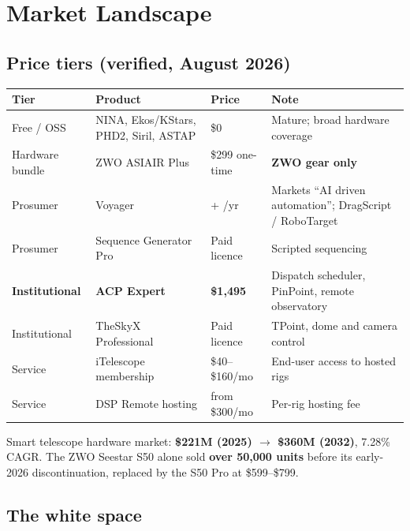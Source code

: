 \documentclass[11pt]{article}
\newcommand{\dollar}[1]{\$#1}
\begin{document}
\section{Market Landscape}

\subsection{Price tiers (verified, August 2026)}

\begin{center}
\small
\begin{tabular}{@{}p{2.6cm}p{4.1cm}p{2.6cm}p{4.4cm}@{}}
\toprule
\textbf{Tier} & \textbf{Product} & \textbf{Price} & \textbf{Note} \\
\midrule
Free / OSS & NINA, Ekos/KStars, PHD2, Siril, ASTAP & \dollar{0} & Mature; broad hardware coverage \\
\addlinespace
Hardware bundle & ZWO ASIAIR Plus & \dollar{299} one-time & \textbf{ZWO gear only} \\
\addlinespace
Prosumer & Voyager & \texteuro129 + \texteuro29/yr & Markets ``AI driven automation''; DragScript / RoboTarget \\
\addlinespace
Prosumer & Sequence Generator Pro & Paid licence & Scripted sequencing \\
\addlinespace
\textbf{Institutional} & \textbf{ACP Expert} & \textbf{\dollar{1{,}495}} & Dispatch scheduler, PinPoint, remote observatory \\
\addlinespace
Institutional & TheSkyX Professional & Paid licence & TPoint, dome and camera control \\
\addlinespace
Service & iTelescope membership & \dollar{40}--\dollar{160}/mo & End-user access to hosted rigs \\
\addlinespace
Service & DSP Remote hosting & from \dollar{300}/mo & Per-rig hosting fee \\
\bottomrule
\end{tabular}
\end{center}

\vspace{0.4em}
Smart telescope hardware market: \textbf{\dollar{221}M (2025) $\rightarrow$
\dollar{360}M (2032)}, 7.28\% CAGR. The ZWO Seestar S50 alone sold
\textbf{over 50,000 units} before its early-2026 discontinuation, replaced by
the S50 Pro at \dollar{599}--\dollar{799}.

\subsection{The white space}
\end{document}
